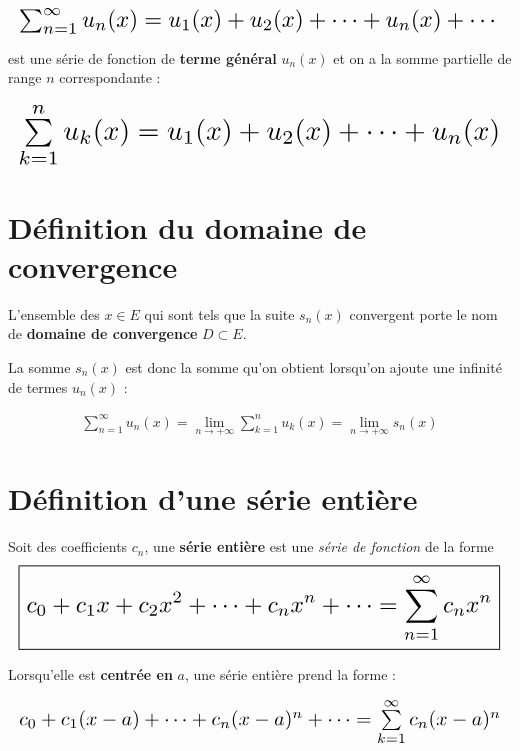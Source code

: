 \documentclass{report}
\begin{document}
\begin{multicols*}{3}
        \begin{align*}
        \resizebox{1\linewidth}{!}{$ 
            \sum_{n=1}^{\infty }u_n(x) = u_1(x) + u_2(x) + \cdots + u_n(x) + \cdots
        $}
        \end{align*}                    

    est une série de fonction de \textbf{terme général}  
    $u_n(x)$ et on a la somme partielle de range $n$ correspondante : 


    \begin{align*}
    \resizebox{1\linewidth}{!}{$ 
        \sum\limits_{k=1}^{n}u_k(x) =  
        u_1(x) + u_2(x) + \cdots + u_n(x)
    $}
    \end{align*}
    
    \section{Définition du domaine de convergence}
    L'ensemble des $x \in E$ qui sont tels que la suite $s_n(x)$ 
    convergent porte le nom de  
    \textbf{\textcolor{myb}{domaine de convergence}} $D \subset E$.    

    La somme $s_n(x)$ est donc la somme qu'on obtient lorsqu'on 
    ajoute une infinité de termes $u_n(x)$ :
 
    \begin{align*}
    \boxed{
        \sum\limits_{n=1}^{\infty }u_n(x) = 
        \lim\limits_{n \to+\infty } 
        \sum\limits_{k=1}^{n}u_k(x) =  
        \lim\limits_{n \to +\infty } s_n(x) 
    }
    \end{align*}

    \vspace{-2em}
    \section{Définition d'une série entière}

    Soit des coefficients $c_n$, 
    une \textbf{série entière} est une \textit{série de fonction}     
    de la forme 
    \begin{align*}
    \resizebox{1\linewidth}{!}{$ 
    \boxed{
        c_0 + c_1x + c_2x^2 + \cdots + c_nx^n + \cdots = 
        \sum\limits_{n=1}^{\infty }  c_nx^n  
    }
$}
    \end{align*} 

    Lorsqu'elle est \textbf{centrée en} $a$, une série entière prend la forme : 

    \begin{align*}
        \resizebox{\linewidth}{!}{$
         c_0 + c_1(x - a) + \cdots + c_n(x - a)^n + \cdots = 
        \sum\limits_{k=1}^{\infty }  c_n(x - a)^n  
    $}
    \end{align*}    



\end{multicols*}
\end{document}
